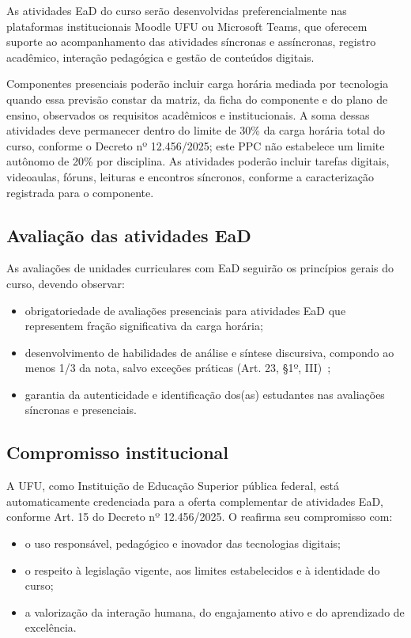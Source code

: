 As atividades EaD do curso serão desenvolvidas preferencialmente nas plataformas institucionais Moodle UFU ou Microsoft Teams, que oferecem suporte ao acompanhamento das atividades síncronas e assíncronas, registro acadêmico, interação pedagógica e gestão de conteúdos digitais.

Componentes presenciais poderão incluir carga horária mediada por tecnologia quando essa previsão constar da matriz, da ficha do componente e do plano de ensino, observados os requisitos acadêmicos e institucionais. A soma dessas atividades deve permanecer dentro do limite de 30\% da carga horária total do curso, conforme o Decreto nº 12.456/2025; este PPC não estabelece um limite autônomo de 20\% por disciplina. As atividades poderão incluir tarefas digitais, videoaulas, fóruns, leituras e encontros síncronos, conforme a caracterização registrada para o componente.

\subsection{Avaliação das atividades EaD}

As avaliações de unidades curriculares com EaD seguirão os princípios gerais do curso, devendo observar:

\begin{itemize}
    \item obrigatoriedade de avaliações presenciais para atividades EaD que representem fração significativa da carga horária;
    \item desenvolvimento de habilidades de análise e síntese discursiva, compondo ao menos 1/3 da nota, salvo exceções práticas (Art. 23, §1º, III)~\cite{mec_decreto_ead_12456_2025};
    \item garantia da autenticidade e identificação dos(as) estudantes nas avaliações síncronas e presenciais.
\end{itemize}

\subsection{Compromisso institucional}

A UFU, como Instituição de Educação Superior pública federal, está automaticamente credenciada para a oferta complementar de atividades EaD, conforme Art. 15 do Decreto nº 12.456/2025. O \ppccurso reafirma seu compromisso com:

\begin{itemize}
    \item o uso responsável, pedagógico e inovador das tecnologias digitais;
    \item o respeito à legislação vigente, aos limites estabelecidos e à identidade do curso;
    \item a valorização da interação humana, do engajamento ativo e do aprendizado de excelência.
\end{itemize}

